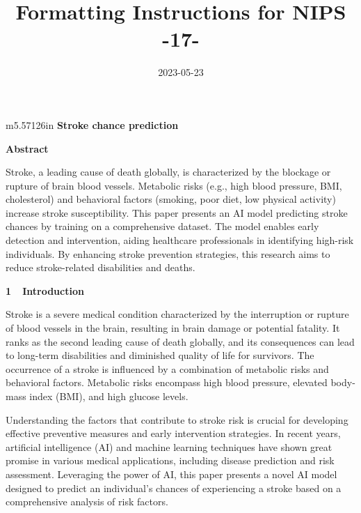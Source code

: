 \documentclass[letterpaper]{article}
\title{Formatting Instructions for NIPS -17-}
\author{}
\date{2023-05-23}
\makeatletter
\newcommand\arraybslash{\let\\\@arraycr}
\makeatother
\begin{document}
\begin{flushleft}
\tablefirsthead{}
\tablehead{}
\tabletail{}
\tablelasttail{}
\begin{supertabular}{m{5.57126in}}
\hline
\centering\arraybslash{ \textbf{Stroke chance prediction}}\\
\end{supertabular}
\end{flushleft}

\bigskip

{\centering{}
\textbf{Abstract}
\par}

{
Stroke, a leading cause of death globally, is characterized by the blockage or rupture of brain blood vessels. Metabolic
risks (e.g., high blood pressure, BMI, cholesterol) and behavioral factors (smoking, poor diet, low physical activity)
increase stroke susceptibility. This paper presents an AI model predicting stroke chances by training on a
comprehensive dataset. The model enables early detection and intervention, aiding healthcare professionals in
identifying high-risk individuals. By enhancing stroke prevention strategies, this research aims to reduce
stroke-related disabilities and deaths.}


\bigskip

{
\textbf{1\ \ Introduction}}


\bigskip

{
Stroke is a severe medical condition characterized by the interruption or rupture of blood vessels in the brain,
resulting in brain damage or potential fatality. It ranks as the second leading cause of death globally, and its
consequences can lead to long-term disabilities and diminished quality of life for survivors. The occurrence of a
stroke is influenced by a combination of metabolic risks and behavioral factors. Metabolic risks encompass high blood
pressure, elevated body-mass index (BMI), and high glucose levels.}


\bigskip

{
Understanding the factors that contribute to stroke risk is crucial for developing effective preventive measures and
early intervention strategies. In recent years, artificial intelligence (AI) and machine learning techniques have shown
great promise in various medical applications, including disease prediction and risk assessment. Leveraging the power
of AI, this paper presents a novel AI model designed to predict an individual's chances of experiencing a stroke based
on a comprehensive analysis of risk factors.}
\end{document}
